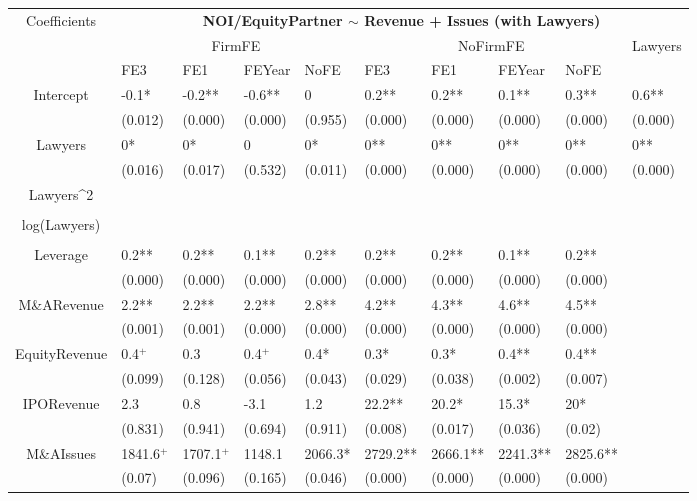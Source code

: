 \documentclass{article}
\begin{document}
\begin{table}[H]
\centering
\begin{tabular}{|clllllllll|}
\hline
\multirow{3}{*}{Coefficients} & \multicolumn{9}{c|}{\textbf{NOI/EquityPartner $\sim$ Revenue + Issues (with Lawyers)}} \\
\cline{2-10}
& \multicolumn{4}{c}{FirmFE} & \multicolumn{4}{c}{NoFirmFE} & \multirow{2}{*}{Lawyers} \\
\cline{2-9}
& FE3 & FE1 & FEYear & NoFE & FE3 & FE1 & FEYear & NoFE &  \\
\hline
 
Intercept & -0.1* & -0.2** & -0.6** & 0 & 0.2** & 0.2** & 0.1** & 0.3** & 0.6** \\ 
   & (0.012) & (0.000) & (0.000) & (0.955) & (0.000) & (0.000) & (0.000) & (0.000) & (0.000) \\ 
  Lawyers & 0* & 0* & 0 & 0* & 0** & 0** & 0** & 0** & 0** \\ 
   & (0.016) & (0.017) & (0.532) & (0.011) & (0.000) & (0.000) & (0.000) & (0.000) & (0.000) \\ 
  Lawyers^2 &  &  &  &  &  &  &  &  &  \\ 
   &  &  &  &  &  &  &  &  &  \\ 
  log(Lawyers) &  &  &  &  &  &  &  &  &  \\ 
   &  &  &  &  &  &  &  &  &  \\ 
  Leverage & 0.2** & 0.2** & 0.1** & 0.2** & 0.2** & 0.2** & 0.1** & 0.2** &  \\ 
   & (0.000) & (0.000) & (0.000) & (0.000) & (0.000) & (0.000) & (0.000) & (0.000) &  \\ 
  M\&ARevenue & 2.2** & 2.2** & 2.2** & 2.8** & 4.2** & 4.3** & 4.6** & 4.5** &  \\ 
   & (0.001) & (0.001) & (0.000) & (0.000) & (0.000) & (0.000) & (0.000) & (0.000) &  \\ 
  EquityRevenue & 0.4$^{+}$ & 0.3 & 0.4$^{+}$ & 0.4* & 0.3* & 0.3* & 0.4** & 0.4** &  \\ 
   & (0.099) & (0.128) & (0.056) & (0.043) & (0.029) & (0.038) & (0.002) & (0.007) &  \\ 
  IPORevenue & 2.3 & 0.8 & -3.1 & 1.2 & 22.2** & 20.2* & 15.3* & 20* &  \\ 
   & (0.831) & (0.941) & (0.694) & (0.911) & (0.008) & (0.017) & (0.036) & (0.02) &  \\ 
  M\&AIssues & 1841.6$^{+}$ & 1707.1$^{+}$ & 1148.1 & 2066.3* & 2729.2** & 2666.1** & 2241.3** & 2825.6** &  \\ 
   & (0.07) & (0.096) & (0.165) & (0.046) & (0.000) & (0.000) & (0.000) & (0.000) &  \\ 

\end{tabular}
\end{table}
\end{document}
